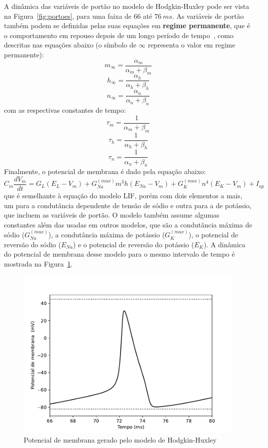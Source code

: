 A dinâmica das variáveis de portão no modelo de Hodgkin-Huxley pode ser vista na Figura~\ref{fig:portoes}, para uma faixa de 66 até $76\ ms$. As variáveis de portão também podem se definidas pelas suas equações em \textbf{regime permanente}, que é o comportamento em repouso depois de um longo período de tempo~\cite{ermentrout_mathematical_2010}, como descritas nas equações abaixo (o símbolo de $\infty$ representa o valor em regime permanente):
\begin{equation}\label{eq:m_inf}
	m_\infty=\frac{\alpha_m}{\alpha_m+\beta_m}
\end{equation}
\begin{equation}\label{eq:h_inf}
	h_\infty=\frac{\alpha_h}{\alpha_h+\beta_h}
\end{equation}
\begin{equation}\label{eq:n_inf}
	n_\infty=\frac{\alpha_n}{\alpha_n+\beta_n}
\end{equation}
com as respectivas constantes de tempo:
\begin{equation}\label{eq:tau_m}
	\tau_m=\frac{1}{\alpha_m+\beta_m}
\end{equation}
\begin{equation}\label{eq:tau_n}
	\tau_h=\frac{1}{\alpha_h+\beta_h}
\end{equation}
\begin{equation}\label{eq:tau_h}
	\tau_n=\frac{1}{\alpha_n+\beta_n}
\end{equation}
Finalmente, o potencial de membrana é dado pela equação abaixo:
\begin{equation}\label{eq:hodgkin_huxley}
	C_m\frac{dV_m}{dt}=G_L(E_L-V_m)+G_{Na}^{(max)}m^3h(E_{Na}-V_m)+G_K^{(max)}n^4(E_K-V_m)+I_{ap}
\end{equation}
que é semelhante à equação do modelo LIF, porém com dois elementos a mais, um para a condutância dependente de tensão de sódio e outra para a de potássio, que incluem as variáveis de portão. O modelo também assume algumas constantes além das usadas em outros modelos, que são a condutância máxima de sódio ($G_{Na}^{(max)}$), a condutância máxima de potássio ($G_K^{(max)}$), o potencial de reversão do sódio ($E_{Na}$) e o potencial de reversão do potássio ($E_K$). A dinâmica do potencial de membrana desse modelo para o mesmo intervalo de tempo é mostrada na Figura~\ref{fig:hhvm}.

\begin{figure}[tb]
	\centering
	\caption{Potencial de membrana gerado pelo modelo de Hodgkin-Huxley}
	\label{fig:hhvm}
	\includegraphics[width=0.7\linewidth]{figs/hh_vm}
\end{figure}
